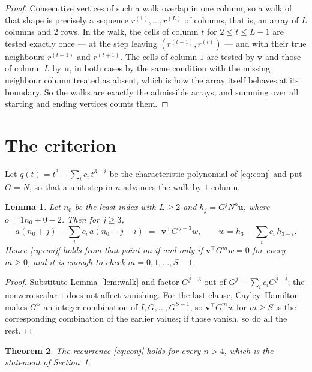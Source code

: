 \documentclass[11pt,a4paper]{article}
\theoremstyle{plain}
\newtheorem{theorem}{Theorem}
\newtheorem{lemma}[theorem]{Lemma}
\theoremstyle{definition}
\begin{document}
\begin{proof}
Consecutive vertices of such a walk overlap in one column, so a walk of that shape is
precisely a sequence $r^{(1)},\dots,r^{(L)}$ of columns, that is, an array of $L$ columns
and $2$ rows. In the walk, the cells of column $t$ for $2\le t\le L-1$ are tested
exactly once --- at the step leaving $(r^{(t-1)},r^{(t)})$ --- and with their true
neighbours $r^{(t-1)}$ and $r^{(t+1)}$. The cells of column $1$ are tested by
$\mathbf{v}$ and those of column $L$ by $\mathbf{u}$, in both cases by the same condition
with the missing neighbour column treated as absent, which is how the array itself behaves at
its boundary. So the walks are exactly the admissible arrays, and summing over all starting
and ending vertices counts them.
\end{proof}

\section{The criterion}

Let $q(t)=t^{3}-\sum_i c_i\,t^{3-i}$ be the characteristic polynomial of
\eqref{eq:conj} and put $G=N$, so that a unit step in $n$ advances the walk by
$1$ column.

\begin{lemma}\label{lem:crit}
Let $n_0$ be the least index with $L\ge2$ and $h_j=G^{j}N^{o}\mathbf{u}$, where
$o=1n_0+0-2$. Then for $j\ge3$,
\[
a(n_0+j)-\sum_i c_i\,a(n_0+j-i)\;=\;\,\mathbf{v}^{\!\top}G^{\,j-3}w,
\qquad w=h_{3}-\sum_i c_i\,h_{3-i} .
\]
Hence \eqref{eq:conj} holds from that point on if and only if
$\mathbf{v}^{\!\top}G^{m}w=0$ for every $m\ge0$, and it is enough to check
$m=0,1,\dots,S-1$.
\end{lemma}

\begin{proof}
Substitute Lemma~\ref{lem:walk} and factor $G^{j-3}$ out of
$G^{j}-\sum_ic_iG^{j-i}$; the nonzero scalar $1$ does not affect
vanishing. For the last clause, Cayley--Hamilton makes $G^{S}$ an integer combination of
$I,G,\dots,G^{S-1}$, so $\mathbf{v}^{\!\top}G^{m}w$ for $m\ge S$ is the corresponding
combination of the earlier values; if those vanish, so do all the rest.
\end{proof}

\begin{theorem}
The recurrence \eqref{eq:conj} holds for every $n>4$, which is the statement of
Section~1.
\end{theorem}
\end{document}
